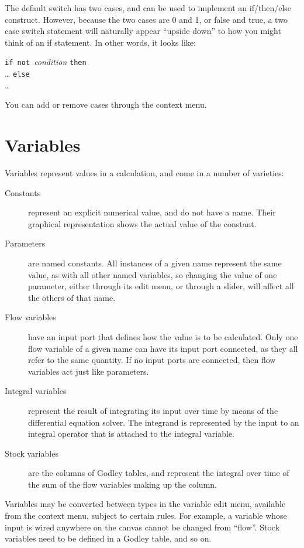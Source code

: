 The default switch has two cases, and can be used to implement an
if/then/else construct. However, because the two cases are 0 and 1,
or false and true, a two case switch statement will naturally appear
``upside down'' to how you might think of an if statement. In other
words, it looks like:

\parbox{\textwidth}{
{\tt if not }{\em condition} {\tt then}\\
 \ldots
{\tt else}\\
\ldots
}

You can add or remove cases through the context menu. 

\section{Variables}\label{Variable:constant}\label{Variable:parameter}
\label{Variable:flow}\label{Variable:integral}\label{Variable:stock}

Variables represent values in a calculation, and come in a number of
varieties:
\begin{description}
\item[Constants] represent an explicit numerical value, and do not
have a name. Their graphical representation shows the actual value of
the constant.
\item[Parameters] are named constants. All instances of a given name
represent the same value, as with all other named variables, so
changing the value of one parameter, either through its edit menu, or
through a slider, will affect all the others of that name.
\item[Flow variables] have an input port that defines how the value is
to be calculated. Only one flow variable of a given name can have its
input port connected, as they all refer to the same quantity. If no
input ports are connected, then flow variables act just like
parameters.
\item[Integral variables] represent the result of integrating its
input over time  by means of the differential
equation solver. The integrand is represented by the input to an
integral operator that is attached to the integral variable.
\item[Stock variables] are the columns of Godley tables, and represent
the integral over time of the sum of the flow variables making up the
column.
\end{description}

Variables may be converted between types in the variable edit menu,
available from the context menu, subject to certain rules. For example,
a variable whose input is wired anywhere on the canvas cannot be
changed from ``flow''. Stock variables need to be defined in a Godley
table, and so on.

